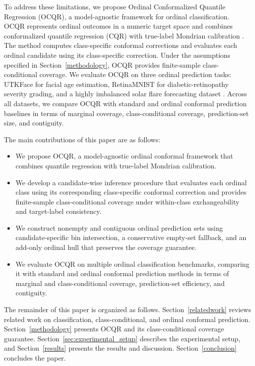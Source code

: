 \documentclass[conference]{IEEEtran}
\begin{document}
To address these limitations, we propose Ordinal Conformalized Quantile Regression (OCQR), a model-agnostic framework for ordinal classification. OCQR represents ordinal outcomes in a numeric target space and combines conformalized quantile regression (CQR) \cite{romano2019cqr} with true-label Mondrian calibration \cite{vovk2012conditional,vovk2005algorithmic}. The method computes class-specific conformal corrections and evaluates each ordinal candidate using its class-specific correction. Under the assumptions specified in Section~\ref{methodology}, OCQR provides finite-sample class-conditional coverage. We evaluate OCQR on three ordinal prediction tasks: UTKFace \cite{utkface-zhifei2017cvpr} for facial age estimation, RetinaMNIST \cite{medmnistv2} for diabetic-retinopathy severity grading, and a highly imbalanced solar flare forecasting dataset \cite{roy2026suryabench}. Across all datasets, we compare OCQR with standard and ordinal conformal prediction baselines in terms of marginal coverage, class-conditional coverage, prediction-set size, and contiguity.

The main contributions of this paper are as follows:
\begin{itemize}
\item We propose OCQR, a model-agnostic ordinal conformal framework that combines quantile regression with true-label Mondrian calibration.

\item We develop a candidate-wise inference procedure that evaluates each ordinal class using its corresponding class-specific conformal correction and provides finite-sample class-conditional coverage under within-class exchangeability and target-label consistency.

\item We construct nonempty and contiguous ordinal prediction sets using candidate-specific bin intersection, a conservative empty-set fallback, and an add-only ordinal hull that preserves the coverage guarantee.

\item We evaluate OCQR on multiple ordinal classification benchmarks, comparing it with standard and ordinal conformal prediction methods in terms of marginal and class-conditional coverage, prediction-set efficiency, and contiguity.

\end{itemize}

The remainder of this paper is organized as follows. Section~\ref{relatedwork} reviews related work on classification, class-conditional, and ordinal conformal prediction. Section~\ref{methodology} presents OCQR and its class-conditional coverage guarantee. Section~\ref{sec:experimental_setup} describes the experimental setup, and Section~\ref{results} presents the results and discussion. Section~\ref{conclusion} concludes the paper.
\end{document}
